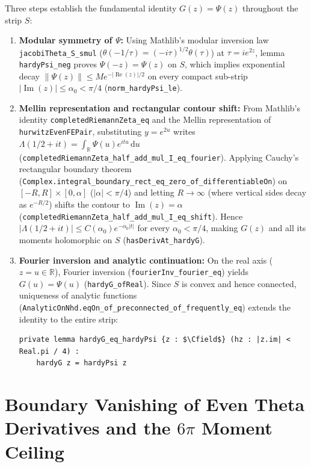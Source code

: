 \documentclass[11pt,a4paper]{article}
\theoremstyle{definition}
\newcommand{\dee}{\mathrm{d}}
\newcommand{\Rset}{\mathbb{R}}
\newcommand{\Cfield}{\mathbb{C}}
\begin{document}
Three steps establish the fundamental identity $G(z) = \Psi(z)$ throughout the strip $S$:
\begin{enumerate}[noitemsep]
\item \textbf{Modular symmetry of $\Psi$:} Using Mathlib's modular inversion law \texttt{jacobiTheta\_S\_smul} ($\theta(-1/\tau) = (-i\tau)^{1/2}\theta(\tau)$) at $\tau = i e^{2z}$, lemma \texttt{hardyPsi\_neg} proves $\Psi(-z) = \Psi(z)$ on $S$, which implies exponential decay $\|\Psi(z)\| \le M e^{-|\operatorname{Re}(z)|/2}$ on every compact sub-strip $|\operatorname{Im}(z)| \le \alpha_0 < \pi/4$ (\texttt{norm\_hardyPsi\_le}).
\item \textbf{Mellin representation and rectangular contour shift:} From Mathlib's identity \texttt{completedRiemannZeta\_eq} and the Mellin representation of \texttt{hurwitzEvenFEPair}, substituting $y = e^{2u}$ writes $\Lambda(1/2 + it) = \int_{\Rset} \Psi(u) e^{itu}\,\dee u$ (\texttt{completedRiemannZeta\_\allowbreak half\_\allowbreak add\_\allowbreak mul\_I\_\allowbreak eq\_\allowbreak fourier}). Applying Cauchy's rectangular boundary theorem (\texttt{Complex.\allowbreak integral\_\allowbreak boundary\_\allowbreak rect\_\allowbreak eq\_\allowbreak zero\_\allowbreak of\_\allowbreak differentiableOn}) on $[-R,R] \times [0,\alpha]$ ($|\alpha| < \pi/4$) and letting $R \to \infty$ (where vertical sides decay as $e^{-R/2}$) shifts the contour to $\operatorname{Im}(z) = \alpha$ (\texttt{completedRiemannZeta\_\allowbreak half\_\allowbreak add\_\allowbreak mul\_I\_\allowbreak eq\_\allowbreak shift}). Hence $|\Lambda(1/2+it)| \le C(\alpha_0)e^{-\alpha_0|t|}$ for every $\alpha_0 < \pi/4$, making $G(z)$ and all its moments holomorphic on $S$ (\texttt{hasDerivAt\_\allowbreak hardyG}).
\item \textbf{Fourier inversion and analytic continuation:} On the real axis ($z = u \in \Rset$), Fourier inversion (\texttt{fourierInv\_fourier\_eq}) yields $G(u) = \Psi(u)$ (\texttt{hardyG\_ofReal}). Since $S$ is convex and hence connected, uniqueness of analytic functions (\texttt{AnalyticOnNhd.\allowbreak eqOn\_\allowbreak of\_\allowbreak preconnected\_\allowbreak of\_\allowbreak frequently\_eq}) extends the identity to the entire strip:
\begin{lstlisting}
private lemma hardyG_eq_hardyPsi {z : $\Cfield$} (hz : |z.im| < Real.pi / 4) :
    hardyG z = hardyPsi z
\end{lstlisting}
\end{enumerate}

\section{Boundary Vanishing of Even Theta Derivatives and the \texorpdfstring{$6\pi$}{6pi} Moment Ceiling}\label{sec:moments}
\end{document}
